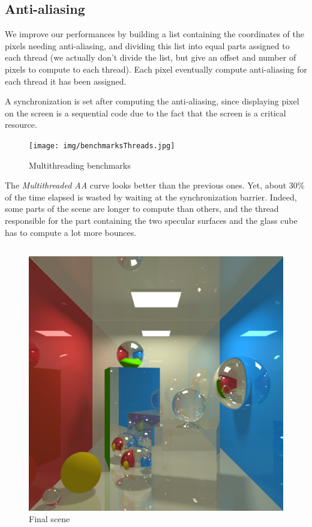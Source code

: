 \subsection{Anti-aliasing}
We improve our performances by building a list containing the coordinates of the pixels needing anti-aliasing, and dividing this list into equal parts assigned to each thread (we actually don't divide the list, but give an offset and number of pixels to compute to each thread). Each pixel eventually compute anti-aliasing for each thread it has been assigned.

A synchronization is set after computing the anti-aliasing, since displaying pixel on the screen is a sequential code due to the fact that the screen is a critical resource.

\begin{figure}[H]
\centering
\texttt{[image: img/benchmarksThreads.jpg]}
\caption{Multithreading benchmarks}
\end{figure}

The \textit{Multithreaded AA} curve looks better than the previous ones. Yet, about 30\% of the time elapsed is wasted by waiting at the synchronization barrier. Indeed, some parts of the scene are longer to compute than others, and the thread responsible for the part containing the two specular surfaces and the glass cube has to compute a lot more bounces.

\subsection{}

\begin{figure}[H]
\centering
\includegraphics[width=0.6\linewidth]{img/final.png}
\caption{Final scene}
\end{figure}
